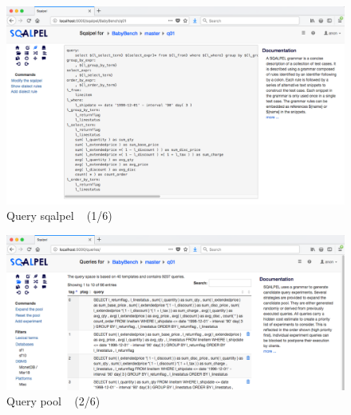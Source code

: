 \documentclass{cidr-2019}
\begin{document}

\begin{figure}[t!]
  \centering
  \includegraphics[width=\textwidth]{Figures/scalpel2.png}
  \caption{Query {\sc sqalpel} ~ \textsf{(1/6)}
    \label{fig:sqalpel}}
\end{figure}




\begin{figure}[t!]
\centering
\includegraphics[width=\textwidth]{Figures/querypool2.png}
\caption{Query pool ~ \textsf{(2/6)}
	\label{fig:querypool2}}
\end{figure}
\end{document}
